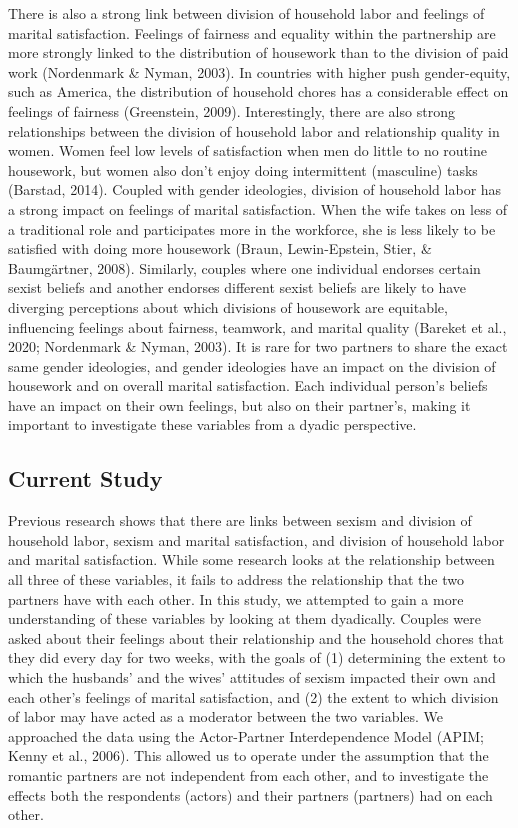 \documentclass[
  english,
  man]{apa6}
\begin{document}
There is also a strong link between division of household labor and feelings of marital satisfaction. Feelings of fairness and equality within the partnership are more strongly linked to the distribution of housework than to the division of paid work (Nordenmark \& Nyman, 2003). In countries with higher push gender-equity, such as America, the distribution of household chores has a considerable effect on feelings of fairness (Greenstein, 2009). Interestingly, there are also strong relationships between the division of household labor and relationship quality in women. Women feel low levels of satisfaction when men do little to no routine housework, but women also don't enjoy doing intermittent (masculine) tasks (Barstad, 2014). Coupled with gender ideologies, division of household labor has a strong impact on feelings of marital satisfaction. When the wife takes on less of a traditional role and participates more in the workforce, she is less likely to be satisfied with doing more housework (Braun, Lewin-Epstein, Stier, \& Baumgärtner, 2008). Similarly, couples where one individual endorses certain sexist beliefs and another endorses different sexist beliefs are likely to have diverging perceptions about which divisions of housework are equitable, influencing feelings about fairness, teamwork, and marital quality (Bareket et al., 2020; Nordenmark \& Nyman, 2003). It is rare for two partners to share the exact same gender ideologies, and gender ideologies have an impact on the division of housework and on overall marital satisfaction. Each individual person's beliefs have an impact on their own feelings, but also on their partner's, making it important to investigate these variables from a dyadic perspective.

\hypertarget{current-study}{%
\subsection{Current Study}\label{current-study}}

Previous research shows that there are links between sexism and division of household labor, sexism and marital satisfaction, and division of household labor and marital satisfaction. While some research looks at the relationship between all three of these variables, it fails to address the relationship that the two partners have with each other. In this study, we attempted to gain a more understanding of these variables by looking at them dyadically. Couples were asked about their feelings about their relationship and the household chores that they did every day for two weeks, with the goals of (1) determining the extent to which the husbands' and the wives' attitudes of sexism impacted their own and each other's feelings of marital satisfaction, and (2) the extent to which division of labor may have acted as a moderator between the two variables. We approached the data using the Actor-Partner Interdependence Model (APIM; Kenny et al., 2006). This allowed us to operate under the assumption that the romantic partners are not independent from each other, and to investigate the effects both the respondents (actors) and their partners (partners) had on each other.
\end{document}
